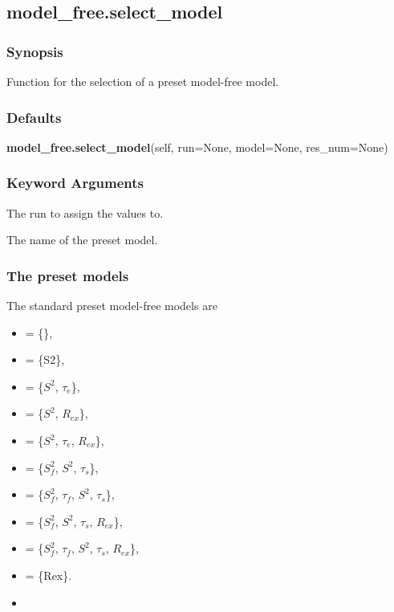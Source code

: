 
  

 \newpage 

 \subsection{model\_free.select\_model} 

  
 \subsubsection{Synopsis} 

 Function for the selection of a preset model-free model. 
  

  
 \subsubsection{Defaults} 

 \textsf{\textbf{model\_free.select\_model}(self, run=None, model=None, res\_num=None)} 

  
 \subsubsection{Keyword Arguments} 

   The run to assign the values to.   

   The name of the preset model.  

  

  
 \subsubsection{The preset models} 

 The standard preset model-free models are 
  

 \begin{itemize} 
 \item[]  = \{\},  
 \item[]  = \{S2\},  
 \item[]  = \{$S^2$, $\tau_e$\},  
 \item[]  = \{$S^2$, $R_{ex}$\},  
 \item[]  = \{$S^2$, $\tau_e$, $R_{ex}$\},  
 \item[]  = \{$S^2_f$, $S^2$, $\tau_s$\},  
 \item[]  = \{$S^2_f$, $\tau_f$, $S^2$, $\tau_s$\},  
 \item[]  = \{$S^2_f$, $S^2$, $\tau_s$, $R_{ex}$\},  
 \item[]  = \{$S^2_f$, $\tau_f$, $S^2$, $\tau_s$, $R_{ex}$\},  
 \item[]  = \{Rex\}.  
 \item[]  
 \end{itemize} 
  

